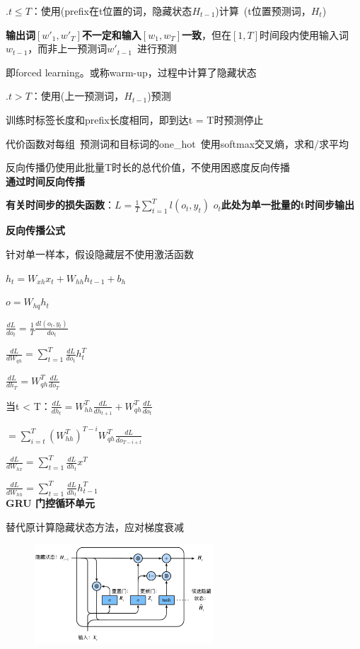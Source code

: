 \documentclass[UTF8]{ctexart}
\begin{document}
  \quad {}.$t \leq T$：使用(prefix在t位置的词，隐藏状态$H_{t-1}$)计算\ (t位置预测词，$H_t$)

  \quad \quad \quad \textbf{输出词$[w'_{1}, w'_{T}]$不一定和输入$[w_1, w_T]$一致}，但在$[1, T]$时间段内使用输入词$w_{t-1}$，而非上一预测词$w'_{t-1}$\ 进行预测

  \quad \quad \quad 即forced learning。或称warm-up，过程中计算了隐藏状态
  
  \quad {}.$t > T$：使用(上一预测词，$H_{t-1}$)预测

  \quad \quad \quad 训练时标签长度和prefix长度相同，即到达t = T时预测停止
  
  \quad \quad 代价函数对每组\ 预测词和目标词的one\_hot\ 使用softmax交叉熵，求和/求平均
  
  \quad \quad \quad 反向传播仍使用此批量T时长的总代价值，不使用困惑度反向传播\\
\textbf{通过时间反向传播}

  \textbf{有关时间步的损失函数}：$L = \frac{1}{T}\sum_{t = 1}^{T} l(o_t, y_t) $ \textbf{$o_t$此处为单一批量的t时间步输出}

  \textbf{反向传播公式} 
  
  \quad 针对单一样本，假设隐藏层不使用激活函数

  \quad \quad $h_t = W_{xh}x_t + W_{hh}h_{t-1} + b_h$

  \quad \quad $o = W_{hq}h_t$
  
  \quad $\frac{d L}{d o_t} = \frac{1}{T}\frac{d l(o_t, y_t)}{d o_t}$
  
  \quad $\frac{d L}{d W_{qh}} = \sum_{t=1}^{T}\frac{d L}{d o_t}h_t^T$
  
  \quad $\frac{d L}{d h_T} = W_{qh}^T\frac{d L}{d o_T}$
  
  \quad 当t < T：$\frac{d L}{d h_t} = W_{hh}^T\frac{d L}{d h_{t+1}} + W_{qh}^T\frac{d L}{d o_t}$
  
  \quad \quad $ = \sum_{i=t}^{T}(W_{hh}^T)^{T - i}W_{qh}^T\frac{d L}{d o_{T - i + t}}$
  
  \quad $\frac{d L}{d W_{hx}} = \sum_{t=1}^{T}\frac{d L}{d h_t}x^T$
  
  \quad $\frac{d L}{d W_{hh}} = \sum_{t=1}^{T}\frac{d L}{d h_t}h_{t-1}^T$\\
\textbf{GRU 门控循环单元}

  替代原计算隐藏状态方法，应对梯度衰减
  \begin{figure}[H] %
    \centering %
    \includegraphics[width=0.6\textwidth]{note_images/GRU.png} %
  \end{figure}
\end{document}
